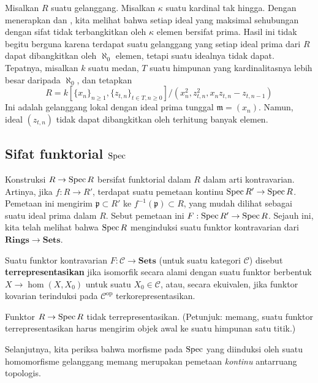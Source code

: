 \begin{remark}
\label{remark-cohen-bound-cardinality}
Misalkan $R$ suatu gelanggang. Misalkan $\kappa$ suatu kardinal tak hingga.
Dengan menerapkan
 dan
,
kita melihat bahwa setiap ideal yang maksimal sehubungan dengan sifat tidak
terbangkitkan oleh $\kappa$ elemen bersifat prima. Hasil ini tidak begitu
berguna karena terdapat suatu gelanggang yang setiap ideal prima
dari $R$ dapat dibangkitkan oleh $\aleph_0$ elemen, tetapi suatu
idealnya tidak dapat. Tepatnya, misalkan $k$ suatu medan, $T$ suatu himpunan yang
kardinalitasnya lebih besar daripada $\aleph_0$, dan tetapkan
\[ R = k[\{x_n\}_{n \geq 1}, \{z_{t, n}\}_{t \in T, n \geq 0}]/
(x_n^2, z_{t, n}^2, x_n z_{t, n} - z_{t, n - 1}) \]
Ini adalah gelanggang lokal dengan ideal prima tunggal
$\mathfrak m = (x_n)$. Namun, ideal $(z_{t, n})$ tidak dapat
dibangkitkan oleh terhitung banyak elemen.
\end{remark}

\subsection{Sifat funktorial $\operatorname{Spec}$}
 Konstruksi $R \to \operatorname{Spec} R$ bersifat funktorial dalam $R$ dalam arti
 kontravarian. Artinya, jika $f: R \to R'$, terdapat suatu
pemetaan kontinu $\operatorname{Spec}
R' \to \operatorname{Spec} R$. Pemetaan ini mengirim $\mathfrak{p} \subset R'$ ke
$f^{-1}(\mathfrak{p}) \subset R$, yang mudah dilihat sebagai suatu ideal
prima
dalam $R$. Sebut pemetaan ini $F: \operatorname{Spec} R' \to \operatorname{Spec} R$. Sejauh ini, kita telah
melihat bahwa
$\operatorname{Spec} R$ menginduksi suatu funktor kontravarian dari $\mathbf{Rings}
\to \mathbf{Sets}$.

\begin{exercise} 
Suatu funktor kontravarian $F: \mathcal{C} \to \mathbf{Sets}$ (untuk
suatu kategori
$\mathcal{C}$) disebut \textbf{terrepresentasikan} jika
isomorfik secara alami
dengan suatu funktor berbentuk $X \to \hom(X, X_0)$ untuk suatu $X_0 \in
\mathcal{C}$,
atau, secara ekuivalen, jika funktor kovarian terinduksi pada
$\mathcal{C}^{\mathrm{op}}$ terkorepresentasikan. 

Funktor $R \to \operatorname{Spec} R $ tidak terrepresentasikan. (Petunjuk:
memang, suatu funktor terrepresentasikan
harus mengirim objek awal ke suatu himpunan satu titik.)
\end{exercise} 

Selanjutnya, kita periksa bahwa morfisme pada $\operatorname{Spec}$ yang diinduksi oleh suatu
homomorfisme gelanggang memang merupakan pemetaan \emph{kontinu} antarruang
topologis.


